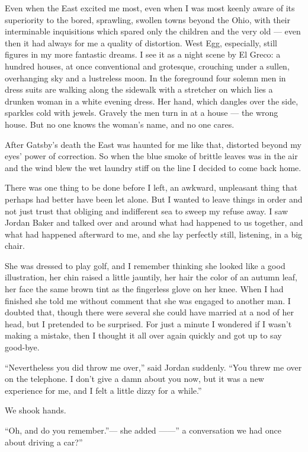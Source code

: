\documentclass{znotebook}
\begin{document}
Even when the East excited me most, even when I was most keenly aware of its superiority to the bored, sprawling, swollen towns beyond the Ohio, with their interminable inquisitions which spared only the children and the very old — even then it had always for me a quality of distortion. West Egg, especially, still figures in my more fantastic dreams. I see it as a night scene by El Greco: a hundred houses, at once conventional and grotesque, crouching under a sullen, overhanging sky and a lustreless moon. In the foreground four solemn men in dress suits are walking along the sidewalk with a stretcher on which lies a drunken woman in a white evening dress. Her hand, which dangles over the side, sparkles cold with jewels. Gravely the men turn in at a house — the wrong house. But no one knows the woman's name, and no one cares.

After Gatsby's death the East was haunted for me like that, distorted beyond my eyes' power of correction. So when the blue smoke of brittle leaves was in the air and the wind blew the wet laundry stiff on the line I decided to come back home.

There was one thing to be done before I left, an awkward, unpleasant thing that perhaps had better have been let alone. But I wanted to leave things in order and not just trust that obliging and indifferent sea to sweep my refuse away. I saw Jordan Baker and talked over and around what had happened to us together, and what had happened afterward to me, and she lay perfectly still, listening, in a big chair.

She was dressed to play golf, and I remember thinking she looked like a good illustration, her chin raised a little jauntily, her hair the color of an autumn leaf, her face the same brown tint as the fingerless glove on her knee. When I had finished she told me without comment that she was engaged to another man. I doubted that, though there were several she could have married at a nod of her head, but I pretended to be surprised. For just a minute I wondered if I wasn't making a mistake, then I thought it all over again quickly and got up to say good-bye.

``Nevertheless you did throw me over,'' said Jordan suddenly. ``You threw me over on the telephone. I don't give a damn about you now, but it was a new experience for me, and I felt a little dizzy for a while.''

We shook hands.

``Oh, and do you remember.''— she added ——'' a conversation we had once about driving a car?''
\end{document}
